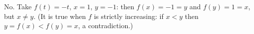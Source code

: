 $\boxed{\text{No}}$. Take $f(t)=-t$, $x=1$, $y=-1$: then $f(x)=-1=y$ and $f(y)=1=x$, but $x\ne y$. (It is true when $f$ is strictly increasing: if $x<y$ then $y=f(x)<f(y)=x$, a contradiction.)
